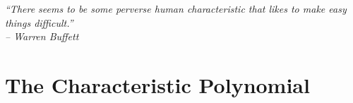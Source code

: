 \begin{center} 
\emph{``There seems to be some perverse human characteristic that likes to make easy things difficult.''\\ -- Warren Buffett}
\end{center}

\section{The Characteristic Polynomial}\label{sec:characteristic}
%
%

